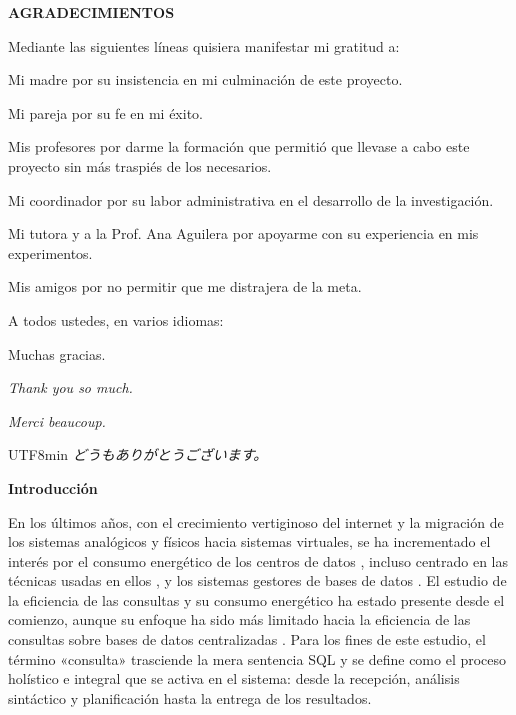\documentclass[12pt, letter paper]{report}
\begin{document}
  \newpage
  \begin{center}
    \Large \textbf{AGRADECIMIENTOS}
  \end{center}

  Mediante las siguientes líneas quisiera manifestar mi gratitud a:

  Mi madre por su insistencia en mi culminación de este proyecto.

  Mi pareja por su fe en mi éxito.

  Mis profesores por darme la formación que permitió que llevase a cabo este
  proyecto sin más traspiés de los necesarios.

  Mi coordinador por su labor administrativa en el desarrollo de la
  investigación.

  Mi tutora y a la Prof. Ana Aguilera por apoyarme con su experiencia en mis
  experimentos.

  Mis amigos por no permitir que me distrajera de la meta.

  A todos ustedes, en varios idiomas:

  Muchas gracias.

  \textit{Thank you so much.}

  \textit{Merci beaucoup.}

  \begin{CJK}{UTF8}{min}
    \textit{どうもありがとうございます。}
  \end{CJK}

  \tableofcontents

  \newpage
  \begin{center}
    \Large \textbf{Introducción}
  \end{center}

  En los últimos años, con el crecimiento vertiginoso del internet y la
  migración de los sistemas analógicos y físicos hacia sistemas virtuales, se ha
  incrementado el interés por el consumo energético de los centros de datos
  \cite{rongoptimizing2016, maroulisexpress2017}, incluso centrado en las
  técnicas usadas en ellos \cite{florenceenergy2016,
  krzywdapower-performance2018}, y los sistemas gestores de bases de datos
  \cite{bunseenergy2014}. El estudio de la eficiencia de las consultas y su
  consumo energético ha estado presente desde el comienzo, aunque su enfoque ha
  sido más limitado hacia la eficiencia de las consultas sobre bases de datos
  centralizadas \cite{xuexploring2010, langtowards2009, langrethinking2011,
  niemanndoes2013, niemannevaluating2013}. Para los fines de este estudio, el
  término «consulta» trasciende la mera sentencia SQL y se define como el
  proceso holístico e integral que se activa en el sistema: desde la recepción,
  análisis sintáctico y planificación hasta la entrega de los resultados.
\end{document}
